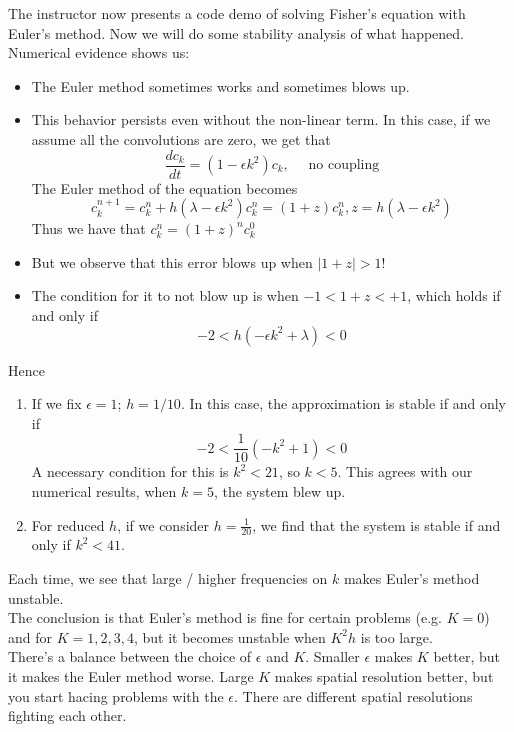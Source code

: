 \documentclass{article}
\begin{document}
The instructor now presents a code demo of solving Fisher's equation with Euler's method. Now we will do some stability analysis of what happened. Numerical evidence shows us:
\begin{itemize}
    \item The Euler method sometimes works and sometimes blows up.
    \item This behavior persists even without the non-linear term. In this case, if we assume all the convolutions are zero, we get that
    \[\frac{dc_k}{dt} = (1 - \epsilon k^2) c_k,\quad \text{ no coupling}\]
    The Euler method of the equation becomes
    \[c_k^{n+1} = c_k^n + h(\lambda - \epsilon k^2) c_k^n = (1 + z) c_k^n, z = h(\lambda - \epsilon k^2)\]
    Thus we have that $c_k^n = (1 + z)^n c_k^0$
    \item But we observe that this error blows up when $|1 + z| > 1$!
    \item The condition for it to not blow up is when $-1 < 1 + z < +1$, which holds if and only if
    \[-2 < h(-\epsilon k^2 + \lambda) < 0\]
\end{itemize}

Hence 
\begin{enumerate}
    \item If we fix $\epsilon = 1$; $h = 1/10$. In this case, the approximation is stable if and only if
    \[-2 < \frac{1}{10} (-k^2 + 1) < 0\]
    A necessary condition for this is $k^2 < 21$, so $k < 5$. This agrees with our numerical results, when $k = 5$, the system blew up.
    \item For reduced $h$, if we consider $h = \frac{1}{20}$, we find that the system is stable if and only if $k^2 < 41$.
\end{enumerate}
Each time, we see that large / higher frequencies on $k$ makes Euler's method unstable.\\

The conclusion is that Euler's method is fine for certain problems (e.g. $K = 0$) and for $K = 1, 2, 3, 4$, but it becomes unstable when $K^2 h$ is too large.\\

There's a balance between the choice of $\epsilon$ and $K$. Smaller $\epsilon$ makes $K$ better, but it makes the Euler method worse. Large $K$ makes spatial resolution better, but you start hacing problems with the $\epsilon$.  There are different spatial resolutions fighting each other.
\end{document}
